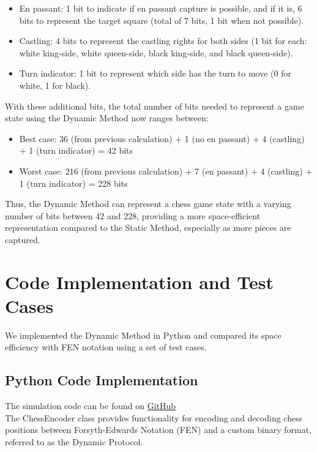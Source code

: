\documentclass[journal]{journal}
\begin{document}
\begin{itemize}  
    \item En passant: 1 bit to indicate if en passant capture is possible, and if it is, 6 bits to represent the target square (total of 7 bits, 1 bit when not possible).  
    \item Castling: 4 bits to represent the castling rights for both sides (1 bit for each: white king-side, white queen-side, black king-side, and black queen-side).  
    \item Turn indicator: 1 bit to represent which side has the turn to move (0 for white, 1 for black).  
\end{itemize}  
   
With these additional bits, the total number of bits needed to represent a game state using the Dynamic Method now ranges between:  
   
\begin{itemize}  
    \item Best case: 36 (from previous calculation) + 1 (no en passant) + 4 (castling) + 1 (turn indicator) = 42 bits  
    \item Worst case: 216 (from previous calculation) + 7 (en passant) + 4 (castling) + 1 (turn indicator) = 228 bits  
\end{itemize}  
   
Thus, the Dynamic Method can represent a chess game state with a varying number of bits between 42 and 228, providing a more space-efficient representation compared to the Static Method, especially as more pieces are captured.

\newpage
\section{Code Implementation and Test Cases}
   
We implemented the Dynamic Method in Python and compared its space efficiency with FEN notation using a set of test cases.
   
\subsection{Python Code Implementation}

The simulation code can be found on \href{https://github.com/knhash/EfficientChessBoardRepresentation/blob/main/simulation.ipynb}{GitHub}  \\

The ChessEncoder class provides functionality for encoding and decoding chess positions between Forsyth-Edwards Notation (FEN) and a custom binary format, referred to as the Dynamic Protocol.  \\
\end{document}
